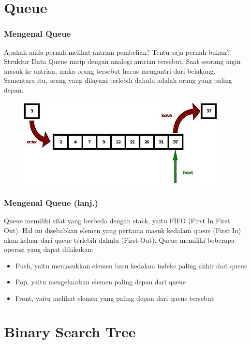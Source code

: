 \section{Queue}
\frame{\sectionpage}

\begin{frame}
\frametitle{Mengenal Queue}

Apakah anda pernah melihat antrian pembelian? Tentu saja pernah bukan?
\newline
\newline
Struktur Data Queue mirip dengan analogi antrian tersebut. Saat seorang ingin masuk ke antrian, maka orang tersebut harus mengantri dari belakang. Sementara itu, orang yang dilayani terlebih dahulu adalah orang yang paling depan.

\begin{figure}
  \centering
  \includegraphics[width=6 cm]{asset/queue.jpg}
\end{figure}
\end{frame}

\begin{frame}
\frametitle{Mengenal Queue (lanj.)}

Queue memiliki sifat yang berbeda dengan stack, yaitu FIFO (First In First Out). Hal ini disebabkan elemen yang pertama masuk kedalam queue (First In) akan keluar dari queue terlebih dahulu (First Out).\newline\newline
Queue memiliki beberapa operasi yang dapat dilakukan:
\begin{itemize}
  \item Push, yaitu memasukkan elemen baru kedalam indeks paling akhir dari queue
  \item Pop, yaitu mengeluarkan elemen paling depan dari queue
  \item Front, yaitu melihat elemen yang paling depan dari queue tersebut
\end{itemize}
\end{frame}

\section{Binary Search Tree}
\frame{\sectionpage}

